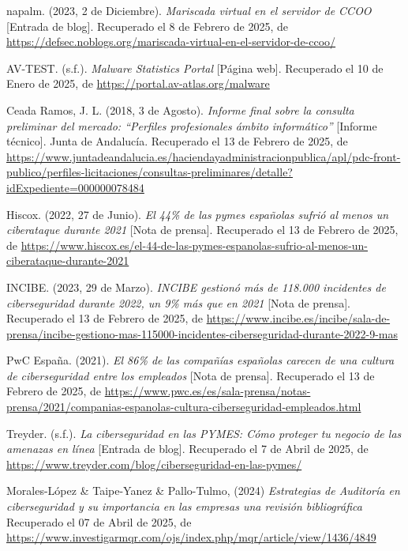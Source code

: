 \documentclass[a4paper, 11pt]{article}
\begin{document}
\begin{thebibliography}{99}
    
    napalm. (2023, 2 de Diciembre). \textit{Mariscada virtual en el servidor de CCOO} [Entrada de blog]. Recuperado el 8 de Febrero de 2025, de \url{https://defsec.noblogs.org/mariscada-virtual-en-el-servidor-de-ccoo/}

    AV-TEST. (s.f.). \textit{Malware Statistics Portal} [Página web]. Recuperado el 10 de Enero de 2025, de \url{https://portal.av-atlas.org/malware}

    Ceada Ramos, J. L. (2018, 3 de Agosto). \textit{Informe final sobre la consulta preliminar del mercado: “Perfiles profesionales ámbito informático”} [Informe técnico]. Junta de Andalucía. Recuperado el 13 de Febrero de 2025, de \url{https://www.juntadeandalucia.es/haciendayadministracionpublica/apl/pdc-front-publico/perfiles-licitaciones/consultas-preliminares/detalle?idExpediente=000000078484}

    Hiscox. (2022, 27 de Junio). \textit{El 44\% de las pymes españolas sufrió al menos un ciberataque durante 2021} [Nota de prensa]. Recuperado el 13 de Febrero de 2025, de \url{https://www.hiscox.es/el-44-de-las-pymes-espanolas-sufrio-al-menos-un-ciberataque-durante-2021}

    INCIBE. (2023, 29 de Marzo). \textit{INCIBE gestionó más de 118.000 incidentes de ciberseguridad durante 2022, un 9\% más que en 2021} [Nota de prensa]. Recuperado el 13 de Febrero de 2025, de \url{https://www.incibe.es/incibe/sala-de-prensa/incibe-gestiono-mas-115000-incidentes-ciberseguridad-durante-2022-9-mas}

    PwC España. (2021). \textit{El 86\% de las compañías españolas carecen de una cultura de ciberseguridad entre los empleados} [Nota de prensa]. Recuperado el 13 de Febrero de 2025, de \url{https://www.pwc.es/es/sala-prensa/notas-prensa/2021/companias-espanolas-cultura-ciberseguridad-empleados.html}

    Treyder. (s.f.). \textit{La ciberseguridad en las PYMES: Cómo proteger tu negocio de las amenazas en línea} [Entrada de blog]. Recuperado el 7 de Abril de 2025, de \url{https://www.treyder.com/blog/ciberseguridad-en-las-pymes/}

    Morales-López \& Taipe-Yanez \& Pallo-Tulmo, (2024) \textit{Estrategias de Auditoría en ciberseguridad y su importancia en las empresas una revisión bibliográfica} Recuperado el 07 de Abril de 2025, de \url{https://www.investigarmqr.com/ojs/index.php/mqr/article/view/1436/4849}


\end{thebibliography}
\end{document}
